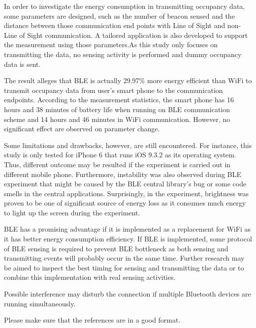 \documentclass[journal]{vgtc}                %
\begin{document}
In order to investigate the energy consumption in transmitting occupancy data, some parameters are designed, such as the number of beacon sensed and the distance between those communication end points with Line of Sight and non-Line of Sight communication. A tailored application is also developed to support the measurement using those parameters.As this study only focuses on transmitting the data, no sensing activity is performed and dummy occupancy data is sent.

The result alleges that BLE is actually 29.97\% more energy efficient than WiFi to transmit occupancy data from user's smart phone to the communication endpoints. According to the measurement statistics, the smart phone has 16 hours and 38 minutes of battery life when running on BLE communication scheme and 14 hours and 46 minutes in WiFi communication. However, no significant effect are observed on parameter change.

Some limitations and drawbacks, however, are still encountered. For instance, this study is only tested for iPhone 6 that runs iOS 9.3.2 as its operating system. Thus, different outcome may be resulted if the experiment is carried out in different mobile phone. Furthermore, instability was also observed during BLE experiment that might be caused by the BLE central library's bug or some code smells in the central applications. Surprisingly, in the experiment, brightness was proven to be one of significant source of energy loss as it consumes much energy to light up the screen during the experiment.

BLE has a promising advantage if it is implemented as a replacement for WiFi as it has better energy consumption efficiency. If BLE is implemented, some protocol of BLE sensing is required to prevent BLE bottleneck as both sensing and transmitting events will probably occur in the same time. Further research may be aimed to inspect the best timing for sensing and transmitting the data or to combine this implementation with real sensing activities.

Possible interference may disturb the connection if multiple Bluetooth devices are running simultaneously\cite{Conte2014}.

Please make sure that the references are in a good format.






\end{document}
